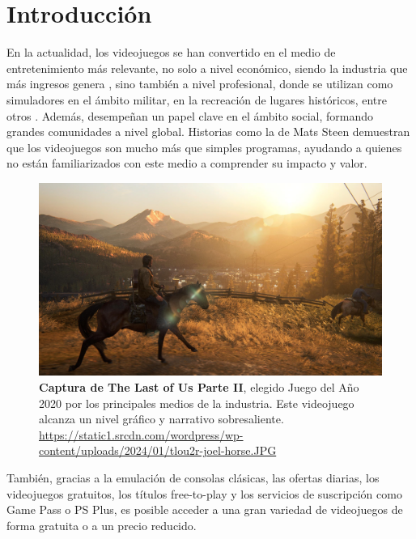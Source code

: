 
\chapter{Introducción}

En la actualidad, los videojuegos se han convertido en el medio de entretenimiento más relevante, no solo a nivel económico, siendo la industria que más ingresos genera \cite{arias2023industria}, sino también a nivel profesional, donde se utilizan como simuladores en el ámbito militar, en la recreación de lugares históricos, entre otros \cite{williamson2005video}. Además, desempeñan un papel clave en el ámbito social, formando grandes comunidades a nivel global. Historias como la de Mats Steen \cite{van2025profound} demuestran que los videojuegos son mucho más que simples programas, ayudando a quienes no están familiarizados con este medio a comprender su impacto y valor.  


\begin{figure}[H]
	\centering
	\includegraphics[width=1\linewidth]{imagenes/tlou2.jpg}
	\caption[\textbf{Captura de The Last of Us Parte II}.]{\textbf{Captura de The Last of Us Parte II}, elegido Juego del Año 2020 por los principales medios de la industria. Este videojuego alcanza un nivel gráfico y narrativo sobresaliente. \href{https://static1.srcdn.com/wordpress/wp-content/uploads/2024/01/tlou2r-joel-horse.JPG}{https://static1.srcdn.com/wordpress/wp-content/uploads/2024/01/tlou2r-joel-horse.JPG}}
	\label{foto-the-last-of-us-2}
\end{figure}

También, gracias a la emulación de consolas clásicas, las ofertas diarias, los videojuegos gratuitos, los títulos free-to-play y los servicios de suscripción como Game Pass o PS Plus, es posible acceder a una gran variedad de videojuegos de forma gratuita o a un precio reducido.  


